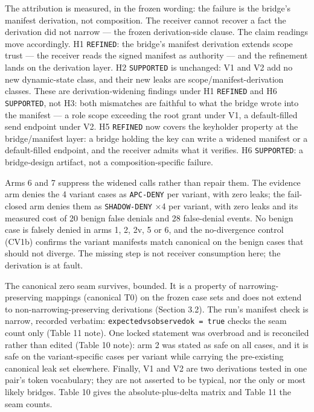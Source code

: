 \documentclass[
  10pt,
]{article}
\let\origtexttt\texttt
\renewcommand{\texttt}[1]{{\upshape\origtexttt{#1}}}
\renewcommand{\_}{\origunderscore\allowbreak}
\begin{document}
The attribution is measured, in the frozen wording: the failure is the
bridge's manifest derivation, not composition. The receiver cannot
recover a fact the derivation did not narrow --- the frozen
derivation-side clause. The claim readings move accordingly. H1
\texttt{REFINED}: the bridge's manifest derivation extends scope trust
--- the receiver reads the signed manifest as authority --- and the
refinement lands on the derivation layer. H2 \texttt{SUPPORTED} is
unchanged: V1 and V2 add no new dynamic-state class, and their new leaks
are scope/manifest-derivation classes. These are derivation-widening
findings under H1 \texttt{REFINED} and H6 \texttt{SUPPORTED}, not H3:
both mismatches are faithful to what the bridge wrote into the manifest
--- a role scope exceeding the root grant under V1, a default-filled
send endpoint under V2. H5 \texttt{REFINED} now covers the keyholder
property at the bridge/manifest layer: a bridge holding the key can
write a widened manifest or a default-filled endpoint, and the receiver
admits what it verifies. H6 \texttt{SUPPORTED}: a bridge-design
artifact, not a composition-specific failure.

Arms 6 and 7 suppress the widened calls rather than repair them. The
evidence arm denies the 4 variant cases as \texttt{APC-DENY} per
variant, with zero leaks; the fail-closed arm denies them as
\texttt{SHADOW-DENY} ×4 per variant, with zero leaks and its measured
cost of 20 benign false denials and 28 false-denial events. No benign
case is falsely denied in arms 1, 2, 2v, 5 or 6, and the no-divergence
control (CV1b) confirms the variant manifests match canonical on the
benign cases that should not diverge. The missing step is not receiver
consumption here; the derivation is at fault.

The canonical zero seam survives, bounded. It is a property of
narrowing-preserving mappings (canonical T0) on the frozen case sets and
does not extend to non-narrowing-preserving derivations (Section 3.2).
The run's manifest check is narrow, recorded verbatim:
\texttt{expected\_vs\_observed\_ok\ =\ true} checks the seam count only
(Table 11 note). One locked statement was overbroad and is reconciled
rather than edited (Table 10 note): arm 2 was stated as safe on all
cases, and it is safe on the variant-specific cases per variant while
carrying the pre-existing canonical leak set elsewhere. Finally, V1 and
V2 are two derivations tested in one pair's token vocabulary; they are
not asserted to be typical, nor the only or most likely bridges. Table
10 gives the absolute-plus-delta matrix and Table 11 the seam counts.
\end{document}
